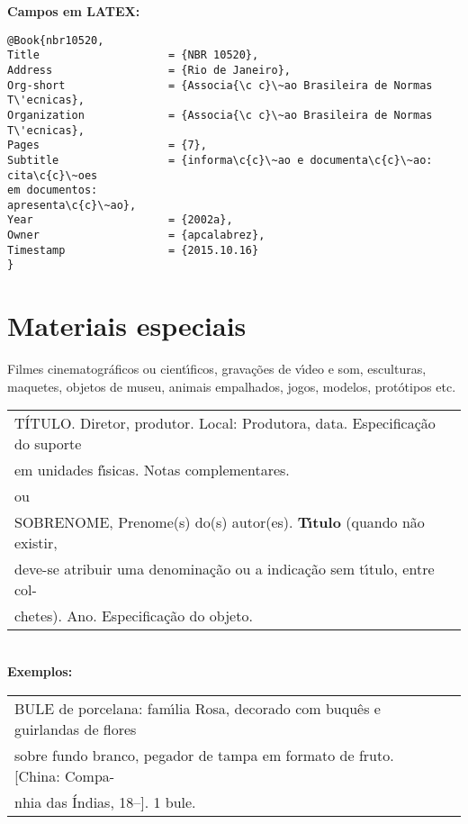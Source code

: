 \textbf{Campos em LATEX:} 

\begin{verbatim}
@Book{nbr10520,
Title                    = {NBR 10520},
Address                  = {Rio de Janeiro},
Org-short                = {Associa{\c c}\~ao Brasileira de Normas 
T\'ecnicas},
Organization             = {Associa{\c c}\~ao Brasileira de Normas 
T\'ecnicas},
Pages                    = {7},
Subtitle                 = {informa\c{c}\~ao e documenta\c{c}\~ao: cita\c{c}\~oes 
em documentos: 
apresenta\c{c}\~ao},
Year                     = {2002a},
Owner                    = {apcalabrez},
Timestamp                = {2015.10.16}
}
\end{verbatim}


\section{Materiais especiais}

Filmes cinematogr\'aficos ou cient\'{\i}ficos, grava\c{c}\~oes de v\'{\i}deo e som,
esculturas, maquetes, objetos de museu, animais empalhados, jogos,
modelos, prot\'otipos etc. \\

\begin{tabular}{|l|c|} \hline
	T\'ITULO. Diretor, produtor. Local: Produtora, data. Especifica\c{c}\~ao do	suporte\\
	em unidades f\'{\i}sicas. Notas complementares. \\
	
	ou\\	
	
	SOBRENOME, Prenome(s) do(s) autor(es). \textbf{T\'{\i}tulo} (quando n\~ao 	existir,\\
	deve-se atribuir uma denomina\c{c}\~ao ou a indica\c{c}\~ao sem 	t\'{\i}tulo, entre col-\\
	chetes). Ano. Especifica\c{c}\~ao do objeto. 
	\\\hline
\end{tabular} \\

\textbf{Exemplos:} \\

\begin{tabular}{|l|c|} \hline
	BULE de porcelana: fam\'{\i}lia Rosa, decorado com buqu\^es e guirlandas de flores\\ 
	sobre fundo branco, pegador de tampa em formato de fruto. [China: Compa-\\
	nhia das \'Indias, 18--]. 1 bule.  
	\\\hline
\end{tabular} \\

